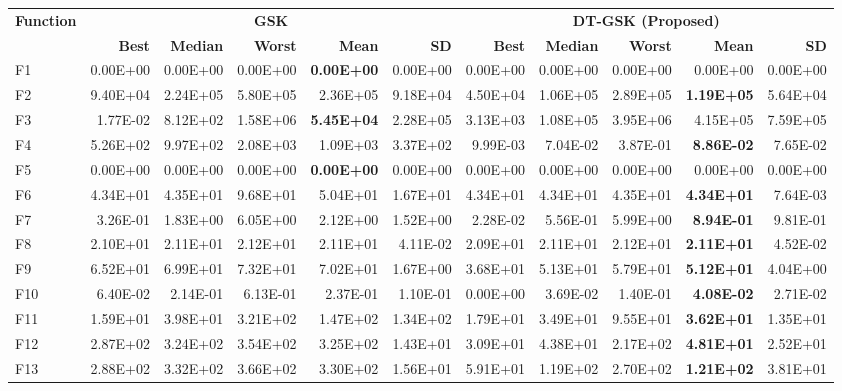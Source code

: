 \zebra
\begin{tabular}{lrrrrrrrrrr}
\toprule
\textbf{Function} & \multicolumn{5}{c}{\textbf{GSK}} & \multicolumn{5}{c}{\textbf{DT-GSK (Proposed)}} \\
\cmidrule(lr){2-6} \cmidrule(lr){7-11}
 & \textbf{Best} & \textbf{Median} & \textbf{Worst} & \textbf{Mean} & \textbf{SD} & \textbf{Best} & \textbf{Median} & \textbf{Worst} & \textbf{Mean} & \textbf{SD} \\
\midrule
F1 & 0.00E+00 & 0.00E+00 & 0.00E+00 & \textbf{0.00E+00} & 0.00E+00 & 0.00E+00 & 0.00E+00 & 0.00E+00 & 0.00E+00 & 0.00E+00 \\
F2 & 9.40E+04 & 2.24E+05 & 5.80E+05 & 2.36E+05 & 9.18E+04 & 4.50E+04 & 1.06E+05 & 2.89E+05 & \textbf{1.19E+05} & 5.64E+04 \\
F3 & 1.77E-02 & 8.12E+02 & 1.58E+06 & \textbf{5.45E+04} & 2.28E+05 & 3.13E+03 & 1.08E+05 & 3.95E+06 & 4.15E+05 & 7.59E+05 \\
F4 & 5.26E+02 & 9.97E+02 & 2.08E+03 & 1.09E+03 & 3.37E+02 & 9.99E-03 & 7.04E-02 & 3.87E-01 & \textbf{8.86E-02} & 7.65E-02 \\
F5 & 0.00E+00 & 0.00E+00 & 0.00E+00 & \textbf{0.00E+00} & 0.00E+00 & 0.00E+00 & 0.00E+00 & 0.00E+00 & 0.00E+00 & 0.00E+00 \\
F6 & 4.34E+01 & 4.35E+01 & 9.68E+01 & 5.04E+01 & 1.67E+01 & 4.34E+01 & 4.34E+01 & 4.35E+01 & \textbf{4.34E+01} & 7.64E-03 \\
F7 & 3.26E-01 & 1.83E+00 & 6.05E+00 & 2.12E+00 & 1.52E+00 & 2.28E-02 & 5.56E-01 & 5.99E+00 & \textbf{8.94E-01} & 9.81E-01 \\
F8 & 2.10E+01 & 2.11E+01 & 2.12E+01 & 2.11E+01 & 4.11E-02 & 2.09E+01 & 2.11E+01 & 2.12E+01 & \textbf{2.11E+01} & 4.52E-02 \\
F9 & 6.52E+01 & 6.99E+01 & 7.32E+01 & 7.02E+01 & 1.67E+00 & 3.68E+01 & 5.13E+01 & 5.79E+01 & \textbf{5.12E+01} & 4.04E+00 \\
F10 & 6.40E-02 & 2.14E-01 & 6.13E-01 & 2.37E-01 & 1.10E-01 & 0.00E+00 & 3.69E-02 & 1.40E-01 & \textbf{4.08E-02} & 2.71E-02 \\
F11 & 1.59E+01 & 3.98E+01 & 3.21E+02 & 1.47E+02 & 1.34E+02 & 1.79E+01 & 3.49E+01 & 9.55E+01 & \textbf{3.62E+01} & 1.35E+01 \\
F12 & 2.87E+02 & 3.24E+02 & 3.54E+02 & 3.25E+02 & 1.43E+01 & 3.09E+01 & 4.38E+01 & 2.17E+02 & \textbf{4.81E+01} & 2.52E+01 \\
F13 & 2.88E+02 & 3.32E+02 & 3.66E+02 & 3.30E+02 & 1.56E+01 & 5.91E+01 & 1.19E+02 & 2.70E+02 & \textbf{1.21E+02} & 3.81E+01 \\

\end{tabular}
